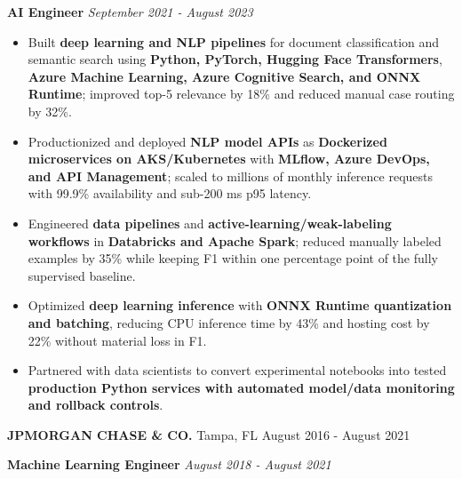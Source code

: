 \documentclass[10pt,letterpaper]{article}
\renewcommand{\emph}[1]{{\fontsize{9.5}{10.26}\selectfont\color{ResumeDates}\itshape #1}}
\providecommand{\tightlist}{%
  \setlength{\itemsep}{2.25pt}\setlength{\parskip}{0pt}}
\begin{document}
\textbf{AI Engineer} \textbar{} \emph{September 2021 - August 2023}

\begin{itemize}
\tightlist
\item
  Built \textbf{deep learning and NLP pipelines} for document
  classification and semantic search using \textbf{Python, PyTorch,
  Hugging Face Transformers}, \textbf{Azure Machine Learning, Azure
  Cognitive Search, and ONNX Runtime}; improved top-5 relevance by 18\%
  and reduced manual case routing by 32\%.
\item
  Productionized and deployed \textbf{NLP model APIs} as
  \textbf{Dockerized microservices on AKS/Kubernetes} with
  \textbf{MLflow, Azure DevOps, and API Management}; scaled to millions
  of monthly inference requests with 99.9\% availability and sub-200 ms
  p95 latency.
\item
  Engineered \textbf{data pipelines} and
  \textbf{active-learning/weak-labeling workflows} in \textbf{Databricks
  and Apache Spark}; reduced manually labeled examples by 35\% while
  keeping F1 within one percentage point of the fully supervised
  baseline.
\item
  Optimized \textbf{deep learning inference} with \textbf{ONNX Runtime
  quantization and batching}, reducing CPU inference time by 43\% and
  hosting cost by 22\% without material loss in F1.
\item
  Partnered with data scientists to convert experimental notebooks into
  tested \textbf{production Python services with automated model/data
  monitoring and rollback controls}.
\end{itemize}

\textbf{JPMORGAN CHASE \& CO.} \textbar{} Tampa, FL \textbar{} August
2016 - August 2021

\textbf{Machine Learning Engineer} \textbar{} \emph{August 2018 - August
2021}
\end{document}
